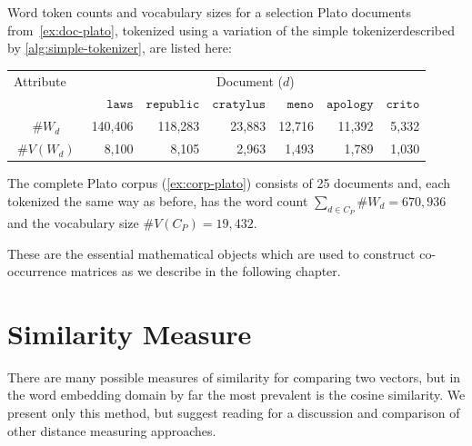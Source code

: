 \begin{example}
  Word token counts and vocabulary sizes for a selection Plato documents from~\ref{ex:doc-plato}, tokenized using a variation of the simple tokenizer\footnotemark described by \autoref{alg:simple-tokenizer}, are listed here:\\[-1em]
  \begin{center}
  \captionsetup{width=.91\linewidth}
    \begin{tabular}{c r r r r r r}
      \toprule
      \multicolumn{1}{c}{Attribute$\quad$} &
      \multicolumn{6}{c}{Document ($d$)} \\

      \cmidrule(lr){2-7}
      &
      $\texttt{laws}$ &
      $\texttt{republic}$ &
      $\texttt{cratylus}$ &
      $\texttt{meno}$ &
      $\texttt{apology}$ &
      $\texttt{crito}$ \\
      \midrule
      $\#W_d$ & 140,406 & 118,283 & 23,883 & 12,716 & 11,392 & 5,332\\
      $\#V(W_d)$ & 8,100 & 8,105 & 2,963 & 1,493 & 1,789 & 1,030\\
      \bottomrule
    \end{tabular}
    \end{center}
\end{example}

\begin{example}
  The complete Plato corpus (\ref{ex:corp-plato}) consists of 25 documents and, each tokenized the same way as before, has the word count $\sum_{d\in C_P}\#W_d=670,936$ and the vocabulary size $\#V(C_P)=19,432$.
\end{example}
\noindent
These are the essential mathematical objects which are used to construct co-occurrence matrices as we describe in the following chapter.

\section{Similarity Measure}
There are many possible measures of similarity for comparing two vectors, but in the word embedding domain by far the most prevalent is the cosine similarity. We present only this method, but suggest reading \textcite{bullinaria-2007-extracting-semantic} for a discussion and comparison of other distance measuring approaches.

